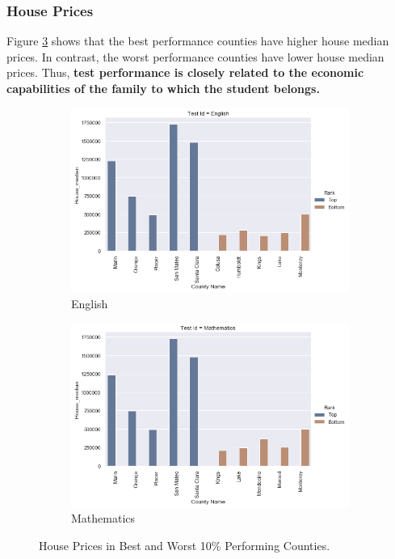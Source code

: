 \documentclass[11pt]{article}
\begin{document}
\subsubsection{House Prices}

Figure \ref{fig:house_price_best_worst_counties} shows that the best performance counties have higher house median prices. In contrast, the worst performance counties have lower house median prices. Thus, \textbf{test performance is closely related to the economic capabilities of the family to which the student belongs.}

\begin{figure}[h!]
\centering
\begin{subfigure}{0.48\textwidth}
         \centering
         \includegraphics[width=\textwidth]{output_50_0.png}
         \caption{English}
         \label{fig:house_price_best_worst_counties_english}
\end{subfigure}
\hfill
\begin{subfigure}{0.48\textwidth}
         \centering
         \includegraphics[width=\textwidth]{output_50_1.png}
         \caption{Mathematics}
         \label{fig:house_price_best_worst_counties_math}
\end{subfigure}
\caption{House Prices in Best and Worst 10\% Performing Counties.}
\label{fig:house_price_best_worst_counties}
\end{figure}
\end{document}
